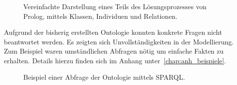 \begin{figure}[H]
\centering {}
\caption{Vereinfachte Darstellung eines Teils des Lösungsprozesses von Prolog, mittels Klassen, Individuen und Relationen.\label{fig:prolog_loesungsprozess}\protect\footnotemark}
\end{figure}

Aufgrund der bisherig erstellten Ontologie konnten konkrete Fragen nicht beantwortet werden. Es zeigten sich Unvollständigkeiten in der Modellierung. Zum Beispiel waren umständlichen Abfragen nötig um einfache Fakten zu erhalten. Details hierzu finden sich im Anhang unter~\ref{chap:anh_beispiele}.

\begin{figure}[H]
\centering {}
\caption{Beispiel einer Abfrage der Ontologie mittels SPARQL.\label{fig:sparql_beispiel}\protect\footnotemark}
\end{figure}

